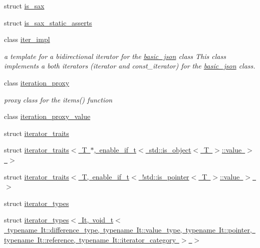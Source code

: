 \begin{DoxyCompactItemize}
struct \mbox{\hyperlink{structnlohmann_1_1detail_1_1is__sax}{is\+\_\+sax}}
\item 
struct \mbox{\hyperlink{structnlohmann_1_1detail_1_1is__sax__static__asserts}{is\+\_\+sax\+\_\+static\+\_\+asserts}}
\item 
class \mbox{\hyperlink{classnlohmann_1_1detail_1_1iter__impl}{iter\+\_\+impl}}
\begin{DoxyCompactList}\small\item\em a template for a bidirectional iterator for the \mbox{\hyperlink{classnlohmann_1_1basic__json}{basic\+\_\+json}} class This class implements a both iterators (iterator and const\+\_\+iterator) for the \mbox{\hyperlink{classnlohmann_1_1basic__json}{basic\+\_\+json}} class. \end{DoxyCompactList}\item 
class \mbox{\hyperlink{classnlohmann_1_1detail_1_1iteration__proxy}{iteration\+\_\+proxy}}
\begin{DoxyCompactList}\small\item\em proxy class for the items() function \end{DoxyCompactList}\item 
class \mbox{\hyperlink{classnlohmann_1_1detail_1_1iteration__proxy__value}{iteration\+\_\+proxy\+\_\+value}}
\item 
struct \mbox{\hyperlink{structnlohmann_1_1detail_1_1iterator__traits}{iterator\+\_\+traits}}
\item 
struct \mbox{\hyperlink{structnlohmann_1_1detail_1_1iterator__traits_3_01_t_01_5_00_01enable__if__t_3_01std_1_1is__objec8d960665487688165530972cda4f1bea}{iterator\+\_\+traits$<$ T $\ast$, enable\+\_\+if\+\_\+t$<$ std\+::is\+\_\+object$<$ T $>$\+::value $>$ $>$}}
\item 
struct \mbox{\hyperlink{structnlohmann_1_1detail_1_1iterator__traits_3_01_t_00_01enable__if__t_3_01_9std_1_1is__pointer_3_01_t_01_4_1_1value_01_4_01_4}{iterator\+\_\+traits$<$ T, enable\+\_\+if\+\_\+t$<$ !std\+::is\+\_\+pointer$<$ T $>$\+::value $>$ $>$}}
\item 
struct \mbox{\hyperlink{structnlohmann_1_1detail_1_1iterator__types}{iterator\+\_\+types}}
\item 
struct \mbox{\hyperlink{structnlohmann_1_1detail_1_1iterator__types_3_01_it_00_01void__t_3_01typename_01_it_1_1differenc4a413e9bd546446175f10f15c5631361}{iterator\+\_\+types$<$ It, void\+\_\+t$<$ typename It\+::difference\+\_\+type, typename It\+::value\+\_\+type, typename It\+::pointer, typename It\+::reference, typename It\+::iterator\+\_\+category $>$ $>$}}

\end{DoxyCompactItemize}
